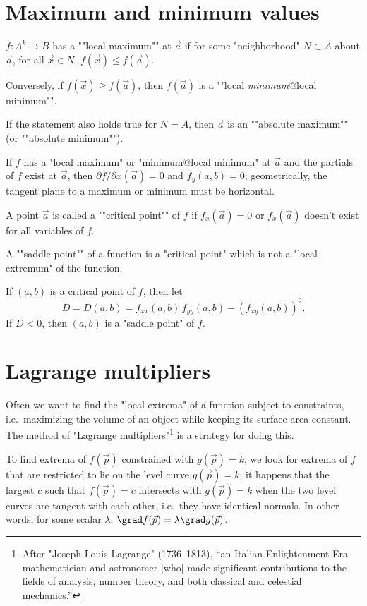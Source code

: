 \documentclass[knowledge]{rbt-mathnotes}
\begin{document}
\section{Maximum and minimum values}
\begin{defn}
  $f : A^k \mapsto B$ has a ""local maximum"" at $\vec a$ if for some
  "neighborhood" $N \subset A$ about $\vec a$, for all $\vec x \in N$,
  $f(\vec x) \le f(\vec a)$.

  Conversely, if $f(\vec x) \ge f(\vec a)$, then $f(\vec a)$ is a ""local
  \emph{minimum}@local minimum"".

  If the statement also holds true for $N = A$, then $\vec a$ is an
  ""absolute maximum"" (or ""absolute minimum"").
\end{defn}

If $f$ has a "local maximum" or "minimum@local minimum" at $\vec a$ and the
partials of $f$ exist at $\vec a$, then $\partial f/\partial x (\vec a) = 0$
and $f_y(a, b) = 0$; geometrically, the tangent plane to a maximum or
minimum must be horizontal.

\begin{defn}
  A point $\vec a$ is called a ""critical point"" of $f$ if $f_x(\vec a) =
  0$ or $f_x(\vec a)$ doesn't exist for all variables of $f$.
\end{defn}

\begin{defn}
  A ""saddle point"" of a function is a "critical point" which is not a
  "local extremum" of the function.
\end{defn}

If $(a, b)$ is a critical point of $f$, then let
\[D = D(a, b) = f_{xx} (a,b) \, f_{yy} (a,b) - (f_{xy}(a,b))^2.\]
If $D < 0$, then $(a, b)$ is a "saddle point" of $f$.

\section{Lagrange multipliers}
Often we want to find the "local extrema" of a function subject to
constraints, i.e.~maximizing the volume of an object while keeping its
surface area constant. The method of "Lagrange multipliers"\footnote{After
"Joseph-Louis Lagrange" (1736--1813), ``an Italian Enlightenment Era
mathematician and astronomer [who] made significant contributions to the
fields of analysis, number theory, and both classical and celestial
mechanics.''} is a strategy for doing this.

To find extrema of $f(\vec p)$ constrained with $g(\vec p) = k$,
we look for extrema of $f$ that are restricted to lie on the level curve
$g(\vec p) = k$; it happens that the largest $c$ such that $f(\vec p) = c$
intersects with  $g(\vec p) = k$ when the two level curves are tangent with
each other, i.e.~they have identical normals. In other words, for some
scalar $\lambda$, $\grad f(\vec p) = \lambda \grad g(\vec p)$.
\end{document}
